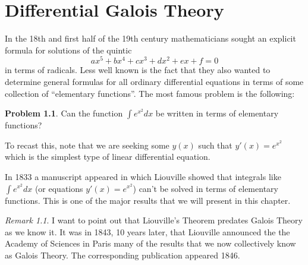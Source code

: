 \documentclass[12pt]{book}
\numberwithin{equation}{section}
\theoremstyle{definition}
\newtheorem{problem}[theorem]{Problem}
\theoremstyle{remark}
\newtheorem{remark}[theorem]{Remark}
\begin{document}




\chapter[Differential Galois Theory]{Differential Galois Theory}

In the 18th and first half of the 19th century mathematicians sought an explicit formula for solutions of the quintic 
$$ ax^5+bx^4+cx^3+dx^2+ex+f=0 $$
in terms of radicals.
Less well known is the fact that they also wanted to determine general formulas for all ordinary  differential equations in terms of some collection of ``elementary functions''.
The most famous problem is the following:
\begin{problem}
	Can the function $\int e^{x^2} dx$ be written in terms of elementary functions?
\end{problem}
To recast this, note that we are seeking some $y(x)$ such that $y'(x) = e^{x^2}$ which is the simplest type of linear differential equation.

In 1833 a manuscript appeared in which Liouville showed that integrals like $\int e^{x^2}dx$ (or equations $y'(x) = e^{x^2}$) can't be solved in terms of elementary functions. 
This is one of the major results that we will present in this chapter.

\begin{remark}
I want to point out that Liouville's Theorem predates Galois Theory as we know it. 
It was in 1843, 10 years later, that Liouville announced the the Academy of Sciences in Paris many of the results that we now collectively know as Galois Theory. The corresponding publication appeared 1846.

\end{remark}
\end{document}
